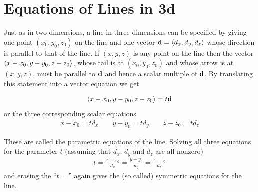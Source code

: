 \section{Equations of Lines in 3d}\label{sec lines 3d}
Just as in two dimensions, a line in three dimensions can be specified  by
giving one point $(x_0,y_0,z_0)$ on the line and one vector 
$\mathbf{d}=\left< d_x,d_y,d_z\right> $ whose direction is parallel to that of the line.
If $(x,y,z)$ is any point on the line then the vector $\left< x-x_0,y-y_0,z-z_0\right> $,
whose tail is at $(x_0,y_0,z_0)$ and whose arrow is at $(x,y,z)$,  must be
parallel to $\mathbf{d}$ and hence a scalar multiple of $\mathbf{d}$. By translating
this statement into a vector equation we get
\begin{impeqn}\label{par eqn of line}
\begin{align*}
\left< x-x_0,y-y_0,z-z_0\right> =t \mathbf{d}
\end{align*}
or the three corresponding scalar equations
\begin{align*}
x-x_0 = t d_x\qquad
y-y_0 = t d_y\qquad
z-z_0 = t d_z
\end{align*}
\end{impeqn}\noindent
These are called the parametric equations of the line.
Solving all three equations for the parameter $t$ (assuming that $d_x$, $d_y$ and $d_z$ are all nonzero)
\begin{align*}
t=\frac{x-x_0}{d_x}=\frac{y-y_0}{d_y}=\frac{z-z_0}{d_z}
\end{align*}
and erasing the ``$t=$'' again gives the (so called) symmetric 
equations for the line. 

